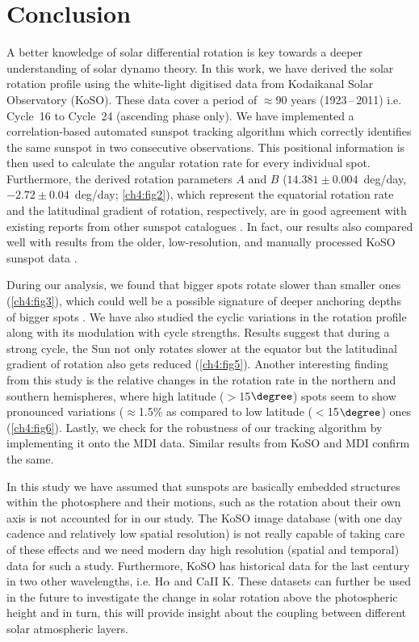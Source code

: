 \section{Conclusion}
\label{ch4-con}

A better knowledge of solar differential rotation is key towards a deeper understanding of solar dynamo theory. In this work, we have derived the solar rotation profile using the white-light digitised data from Kodaikanal Solar Observatory (KoSO). These data cover a period of $\approx$90 years (1923\,--\,2011) i.e. Cycle~16 to Cycle~24 (ascending phase only). We have implemented a correlation-based automated sunspot tracking algorithm which correctly identifies the same sunspot in two consecutive observations. This positional information is then used to calculate the angular rotation rate for every individual spot. Furthermore, the derived rotation parameters $A$ and $B$ ($14.381\pm0.004$~deg/day,~$-2.72\pm0.04$~deg/day; \autoref{ch4:fig2}), which represent the equatorial rotation rate and the latitudinal gradient of rotation, respectively, are in good agreement with existing reports from other sunspot catalogues \citep{Javaraiah2005a, Ribes1993}. In fact, our results also compared well with results from the older, low-resolution, and manually processed KoSO sunspot data \citep{Howard1999, Gupta1999}. 


During our analysis, we found that bigger spots rotate slower than smaller ones (\autoref{ch4:fig3}), which could well be a possible signature of deeper anchoring depths of bigger spots \citep{Balthasar1986}. We have also studied the cyclic variations in the rotation profile along with its modulation with cycle strengths. Results suggest that during a strong cycle, the Sun not only rotates slower at the equator but the latitudinal gradient of rotation also gets reduced (\autoref{ch4:fig5}). Another interesting finding from this study is the relative changes in the rotation rate in the northern and southern hemispheres, where high latitude ($>$15$\degree$) spots seem to show pronounced variations ($\approx$1.5\% as compared to low latitude ($<$15$\degree$) ones (\autoref{ch4:fig6}). Lastly, we check for the robustness of our tracking algorithm by implementing it onto the MDI data. Similar results from KoSO and MDI confirm the same.

In this study we have assumed that sunspots are basically embedded structures within the photosphere and their motions, such as the rotation about their own axis \citep{Brown2003,Svanda2009} is not accounted for in our study. The KoSO image database (with one day cadence and relatively low spatial resolution) is not really capable of taking care of these effects and we need modern day high resolution (spatial and temporal) data for such a study.
Furthermore, KoSO has historical data for the last century in two other wavelengths, i.e. H$\alpha$ and CaII K. These datasets can further be used in the future to investigate the change in solar rotation above the photospheric height and in turn, this will provide insight about the coupling between different solar atmospheric layers. 
